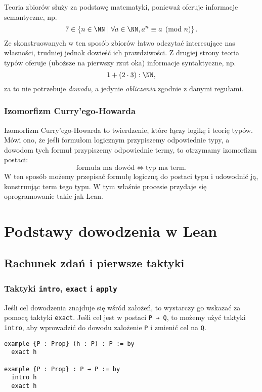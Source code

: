 \documentclass[polish,pretty]{angav}
\newcommand{\Lean}[1]{\texttt{#1}}
\begin{document}
Teoria zbiorów służy za podstawę matematyki, ponieważ oferuje informacje semantyczne, np.
\[ 7 \in \left\{n \in \NN \mid \forall a \in \NN, a^n \equiv a \pmod{n} \right\}. \]
Ze skonstruowanych w ten sposób zbiorów łatwo odczytać interesujące nas własności, trudniej jednak dowieść ich prawdziwości.
Z drugiej strony teoria typów oferuje (uboższe na pierwszy rzut oka) informacje syntaktyczne, np.
\[ 1 + (2 \cdot 3) : \NN, \]
za to nie potrzebuje \emph{dowodu}, a jedynie \emph{obliczenia} zgodnie z danymi regułami.

\subsubsection*{Izomorfizm Curry'ego-Howarda}

Izomorfizm Curry'ego-Howarda to twierdzenie, które łączy logikę i teorię typów.
Mówi ono, że jeśli formułom logicznym przypiszemy odpowiednie typy, a dowodom tych formuł przypiszemy odpowiednie termy, to otrzymamy izomorfizm postaci:
\[ \text{formuła ma dowód} \iff \text{typ ma term}. \]
W ten sposób możemy przepisać formułę logiczną do postaci typu i udowodnić ją, konstruując term tego typu.
W tym właśnie procesie przydaje się oprogramowanie takie jak Lean.


\section{Podstawy dowodzenia w Lean}


\subsection{Rachunek zdań i pierwsze taktyki}

\subsubsection*{Taktyki \texttt{intro}, \texttt{exact} i \texttt{apply}}

Jeśli cel dowodzenia znajduje się wśród założeń, to wystarczy go wskazać za pomocą taktyki \Lean{exact}. Jeśli cel jest w postaci \Lean{P → Q}, to możemy użyć taktyki \Lean{intro}, aby wprowadzić do dowodu założenie \Lean{P} i zmienić cel na \Lean{Q}.
\begin{verbatim}
example {P : Prop} (h : P) : P := by
  exact h

example {P : Prop} : P → P := by
  intro h
  exact h
\end{verbatim}
\end{document}
